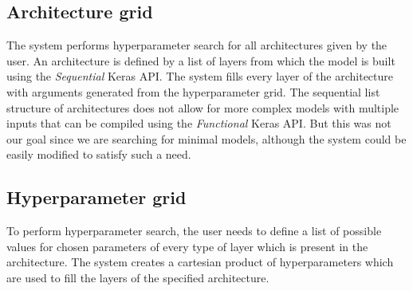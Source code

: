 \documentclass[10pt, a4paper]{article}
\begin{document}
\subsection{Architecture grid}
The system performs hyperparameter search for all architectures
given by the user. 
An architecture is defined by a list of layers from which
the model is built using the \textit{Sequential} Keras API.
The system fills every layer of the architecture with
arguments generated from the hyperparameter grid.
The sequential list structure of architectures does not
allow for more complex models with multiple inputs that can be
compiled using the \textit{Functional} Keras API.
But this was not our goal since we are searching for minimal models, 
although the system could be easily modified to satisfy such a need.

\subsection{Hyperparameter grid}
To perform hyperparameter search, the user needs to define
a list of possible values for chosen parameters of every type
of layer which is present in the architecture.
The system creates a cartesian product of hyperparameters
which are used to fill the layers of the specified architecture.
\end{document}
